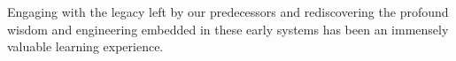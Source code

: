 \documentclass[dvipdfmx, a4paper,12pt]{book}
\begin{document}
Engaging with the legacy left by our predecessors and rediscovering the profound wisdom and engineering embedded in these early systems has been an immensely valuable learning experience.




\backmatter
\newpage\chapter{}

\end{document}
